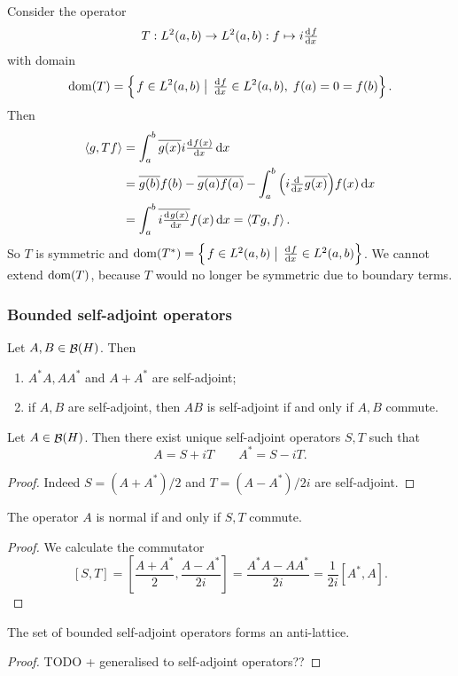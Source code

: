 \begin{example}
Consider the operator
\[ T: L^2(a,b) \to L^2(a,b): f\mapsto i\od{f}{x} \]
with domain
\[ \dom(T) = \setbuilder{f\in L^2(a,b)}{\od{f}{x}\in L^2(a,b),\; f(a) = 0 = f(b)}. \]
Then
\begin{align*}
\inner{g, Tf} &= \int_{a}^b \overline{g(x)}i\od{f(x)}{x}\diff{x} \\
&= \overline{g(b)}f(b) - \overline{g(a)f(a)} - \int_{a}^b \Big(i \od{}{x}\overline{g(x)}\Big)f(x)\diff{x} \\
&= \int_a^b \overline{i \od{g(x)}{x}} f(x) \diff{x} = \inner{Tg, f}.
\end{align*}
So $T$ is symmetric and $\dom(T^*) = \setbuilder{f\in L^2(a,b)}{\od{f}{x}\in L^2(a,b)}$. We cannot extend $\operatorname{dom}(T)$, because $T$ would no longer be symmetric due to boundary terms.
\end{example}

\subsubsection{Bounded self-adjoint operators}
\begin{lemma}
Let $A, B\in\mathop{\mathcal{B}}(H)$. Then
\begin{enumerate}
\item $A^*A, AA^*$ and $A+A^*$ are self-adjoint;
\item if $A,B$ are self-adjoint, then $AB$ is self-adjoint \textup{if and only if} $A,B$ commute.
\end{enumerate}
\end{lemma}
\begin{corollary}
Let $A\in\mathop{\mathcal{B}}(H)$. Then there exist unique self-adjoint operators $S,T$ such that
\[ A = S+iT \qquad A^* = S-iT. \]
\end{corollary}
\begin{proof}
Indeed $S = (A+A^*)/2$ and $T = (A-A^*)/2i$ are self-adjoint.
\end{proof}
\begin{corollary}
The operator $A$ is normal \textup{if and only if} $S,T$ commute.
\end{corollary}
\begin{proof}
We calculate the commutator
\[ [S,T] = \left[\frac{A+A^*}{2}, \frac{A-A^*}{2i}\right] = \frac{A^*A - AA^*}{2i} = \frac{1}{2i}[A^*, A]. \]
\end{proof}

\begin{proposition}
The set of bounded self-adjoint operators forms an anti-lattice.
\end{proposition}
\begin{proof}
TODO + generalised to self-adjoint operators??
\end{proof}


